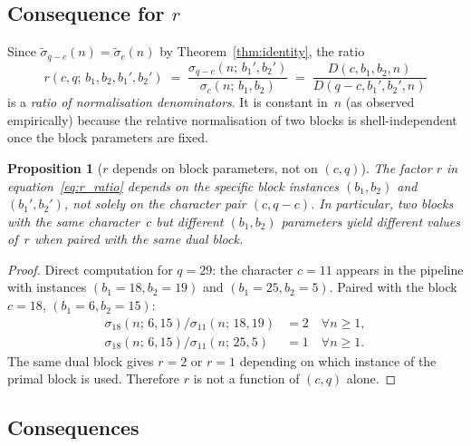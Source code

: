 \documentclass[11pt,a4paper]{article}
\newtheorem{proposition}[theorem]{Proposition}
\theoremstyle{definition}
\begin{document}
    \subsection{Consequence for $r$}

      Since $\tilde\sigma_{q-c}(n) = \tilde\sigma_c(n)$ by
      Theorem~\ref{thm:identity}, the ratio
      \begin{equation}
        r(c,q;\, b_1, b_2, b_1', b_2')
        \;=\; \frac{\sigma_{q-c}(n;\, b_1', b_2')}{\sigma_c(n;\, b_1, b_2)}
        \;=\; \frac{D(c, b_1, b_2, n)}{D(q-c, b_1', b_2', n)}
        \label{eq:r_ratio}
      \end{equation}
      is a \emph{ratio of normalisation denominators}.
      It is constant in~$n$ (as observed empirically) because the
      relative normalisation of two blocks is shell-independent
      once the block parameters are fixed.

      \begin{proposition}[$r$ depends on block parameters, not on $(c,q)$]
        \label{prop:r_artefact}
        The factor $r$ in equation~\eqref{eq:r_ratio} depends on the
        specific block instances $(b_1, b_2)$ and $(b_1', b_2')$,
        not solely on the character pair $(c, q-c)$.
        In particular, two blocks with the same character~$c$ but different
        $(b_1, b_2)$ parameters yield different values of~$r$ when paired
        with the same dual block.
      \end{proposition}

      \begin{proof}
        Direct computation for $q = 29$: the character $c = 11$ appears
        in the pipeline with instances $(b_1=18, b_2=19)$ and $(b_1=25, b_2=5)$.
        Paired with the block $c = 18$, $(b_1=6, b_2=15)$:
        \begin{align*}
          \sigma_{18}(n;\,6,15) / \sigma_{11}(n;\,18,19) &= 2 \quad \forall n \geq 1,\\
          \sigma_{18}(n;\,6,15) / \sigma_{11}(n;\,25,5)  &= 1 \quad \forall n \geq 1.
        \end{align*}
        The same dual block gives $r = 2$ or $r = 1$ depending on
        which instance of the primal block is used.
        Therefore $r$ is not a function of $(c, q)$ alone.
      \end{proof}

    \subsection{Consequences}
\end{document}
